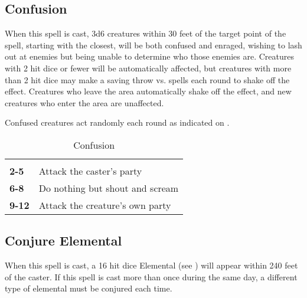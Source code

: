\begin{multicols*}{2}
\subsection{Confusion}\label{spell:Confusion}

When this spell is cast, 3d6 creatures within 30 feet of the target point of the spell, starting with the closest, will be both confused and enraged, wishing to lash out at enemies but being unable to determine who those enemies are. Creatures with 2 hit dice or fewer will be automatically affected, but creatures with more than 2 hit dice may make a saving throw vs. spells each round to shake off the effect. Creatures who leave the area automatically shake off the effect, and new creatures who enter the area are unaffected.

Confused creatures act randomly each round as indicated on .

\begin {table}[H]
  \caption{Confusion}\label{tab:Confusion}
  \begin{tabularx}{\columnwidth}{>{\bfseries}YY}
	 & \\
	2-5 & Attack the caster’s party\\
	6-8 & Do nothing but shout and scream\\
	9-12 & Attack the creature’s own party
  \end {tabularx}
\end {table}

\subsection{Conjure Elemental}\label{spell:Conjure Elemental}

When this spell is cast, a 16 hit dice Elemental (see ) will appear within 240 feet of the caster. If this spell is cast more than once during the same day, a different type of elemental must be conjured each time.


\end{multicols*}
